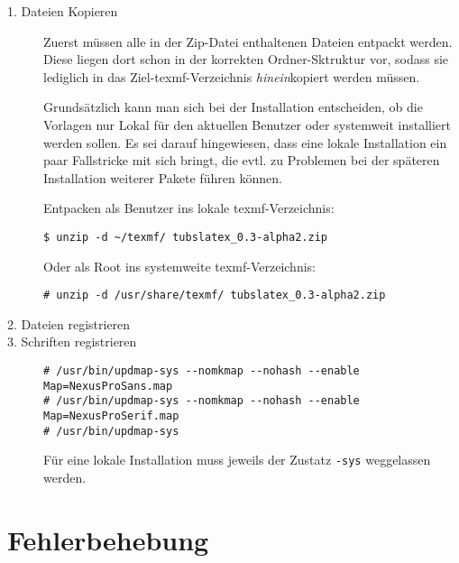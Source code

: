 \begin{description}
  \item[1. Dateien Kopieren] Zuerst müssen alle in der Zip-Datei enthaltenen
    Dateien entpackt werden.
    Diese liegen dort schon in der korrekten Ordner-Sktruktur vor, sodass
    sie lediglich in das Ziel-texmf-Verzeichnis \emph{hinein}kopiert werden
    müssen.
    
    Grundsätzlich kann man sich bei der Installation entscheiden,
    ob die Vorlagen nur Lokal für den aktuellen Benutzer oder systemweit
    installiert werden sollen.
    Es sei darauf hingewiesen, dass eine lokale Installation ein paar
    Fallstricke mit sich bringt, die evtl. zu Problemen bei der späteren
    Installation weiterer Pakete führen können.
    
    Entpacken als Benutzer ins lokale texmf-Verzeichnis:
    \begin{lstlisting}
$ unzip -d ~/texmf/ tubslatex_0.3-alpha2.zip
    \end{lstlisting}
    Oder als Root ins systemweite texmf-Verzeichnis:
    \begin{lstlisting}
# unzip -d /usr/share/texmf/ tubslatex_0.3-alpha2.zip
    \end{lstlisting}

  \item[2. Dateien registrieren]
  \item[3. Schriften registrieren]\hfill

    \begin{lstlisting}
# /usr/bin/updmap-sys --nomkmap --nohash --enable Map=NexusProSans.map
# /usr/bin/updmap-sys --nomkmap --nohash --enable Map=NexusProSerif.map
# /usr/bin/updmap-sys
    \end{lstlisting}
    
    Für eine lokale Installation muss jeweils der Zustatz \texttt{-sys}
    weggelassen werden.

\end{description}


\newenvironment{knownissue}[1]{%
  \paragraph{#1}\hfill
  \newcommand{\solution}[1]{\noindent{\itshape ##1}}
}{%
}

\section{Fehlerbehebung}

